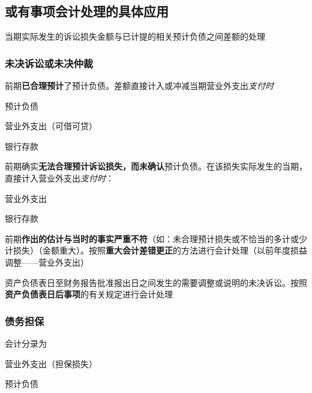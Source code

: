 \documentclass[UTF8,12pt]{ctexart}
\newenvironment{Dr}{%
	\begin{list}{}%
		{
			\setlength{\leftmargin}{2em}
			\setlength{\labelwidth}{2em}
			\setlength{\labelsep}{0pt}
			\setlength{\itemindent}{0pt}
			\setlength{\listparindent}{0pt}
			\setlength{\parsep}{0pt}
			\setlength{\topsep}{0pt}
		}
		\item[\textbf{借：}]
	}{%
	\end{list}
}
\newenvironment{Cr}{%
	\begin{list}{}%
		{
			\setlength{\leftmargin}{3em}
			\setlength{\labelwidth}{2em}
			\setlength{\labelsep}{0pt}
			\setlength{\itemindent}{0pt}
			\setlength{\listparindent}{0pt}
			\setlength{\parsep}{0pt}
			\setlength{\topsep}{0pt}
		}
		\item[\textbf{贷：}]
	}{%
	\end{list}
}
\numberwithin{equation}{section} %
\numberwithin{figure}{section}
\numberwithin{table}{section}
\begin{document}
	\subsection{或有事项会计处理的具体应用}
	当期实际发生的诉讼损失金额与已计提的相关预计负债之间差额的处理
	
	\subsubsection{未决诉讼或未决仲裁}
	\begin{enumerate}
		\item 前期\textbf{已合理预计}了预计负债。差额直接计入或冲减当期营业外支出\textit{支付时}
		
		\begin{Dr}
			预计负债
			
			营业外支出（可借可贷） 
		\end{Dr}
		\begin{Cr}
			银行存款
		\end{Cr}
		
		\item 前期确实\textbf{无法合理预计诉讼损失，而未确认}预计负债。在该损失实际发生的当期，直接计入营业外支出\textit{支付时}：
		
		\begin{Dr}
			营业外支出
		\end{Dr}
		\begin{Cr}
			银行存款
		\end{Cr}
		
		
		\item 前期\textbf{作出的估计与当时的事实严重不符}（如：未合理预计损失或不恰当的多计或少计损失）（金额重大）。按照\textbf{重大会计差错更正}的方法进行会计处理（以前年度损益调整——营业外支出）
		
		
		\item 资产负债表日至财务报告批准报出日之间发生的需要调整或说明的未决诉讼。按照\textbf{资产负债表日后事项}的有关规定进行会计处理
	\end{enumerate}


	\subsubsection{债务担保}
	会计分录为
	
	\begin{Dr}
		营业外支出（担保损失）
	\end{Dr}
	\begin{Cr}
		预计负债
	\end{Cr}
\end{document}
